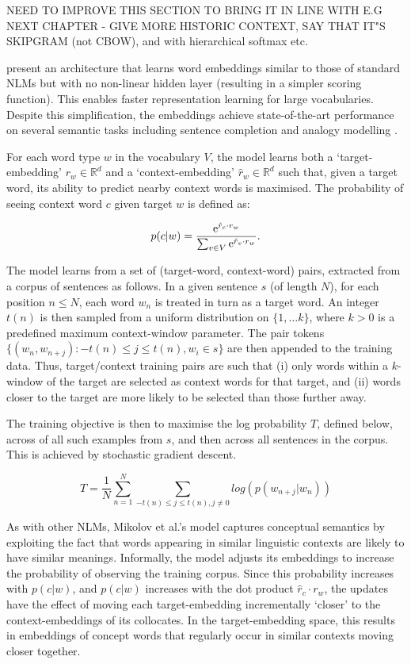 NEED TO IMPROVE THIS SECTION TO BRING IT IN LINE WITH E.G NEXT CHAPTER - GIVE MORE HISTORIC CONTEXT, SAY THAT IT"S SKIPGRAM (not CBOW), and with hierarchical softmax etc.

\cite{mikolov2013efficient} present an architecture that learns word embeddings similar to those of standard NLMs but with no non-linear hidden layer (resulting in a simpler scoring function). This enables faster representation learning for large vocabularies. Despite this simplification, the embeddings achieve state-of-the-art performance on several semantic tasks including sentence completion and analogy modelling \cite{mikolov2013efficient,mikolov2013distributed}.   

For each word type \(w\) in the vocabulary \(V\), the model learns both a `target-embedding' \( r_{w} \in \mathbb{R}^d\) and a `context-embedding' \(\hat{r}_{w} \in \mathbb{R}^d\) such that, given a target word, its ability to predict nearby context words is maximised. The probability of seeing context word \(c\) given target \(w\) is defined as:  

\[p(c|w)  = \frac{\mathrm{e}^{\hat{r}_{c} \cdot r_{w}}}{\sum_{v \in V} \mathrm{e}^{\hat{r}_v\cdot r_{w}}}.\]

The model learns from a set of (target-word, context-word) pairs, extracted from a corpus of sentences as follows. In a given sentence \(s\) (of length \(N\)), for each position \( n \leq N\), each word \(w_n\) is treated in turn as a target word. An integer \( {t(n)} \) is then sampled from a uniform distribution on \( \{1, \dots k \} \), where \(k > 0\) is a predefined maximum context-window parameter. The pair tokens \( \{(w_n, w_{n+j}): -{t(n)}\leq j \leq {t(n)}, w_i \in s \}\) are then appended to the training data. Thus, target/context training pairs are such that (i) only words within a \(k\)-window of the target are selected as context words for that target, and (ii) words closer to the target are more likely to be selected than those further away.

The training objective is then to maximise the log probability \( T\), defined below, across of all such examples from \(s\), and then across all sentences in the corpus. This is achieved by stochastic gradient descent. 

\[ T = \frac{1}{N} \sum_{n=1}^{N} \sum_{-{t(n)}\leq j \leq {t(n)}, j\neq 0} log(  p(w_{n+j}|w_{n}) ) \]

As with other NLMs, Mikolov et al.'s model captures conceptual semantics by exploiting the fact that words appearing in similar linguistic contexts are likely to have similar meanings. Informally, the model adjusts its embeddings to increase the probability of observing the training corpus. Since this probability increases with \(p(c|w)\), and \(p(c|w)\) increases with the dot product \( \hat{r}_c\cdot r_{w} \), the updates have the effect of moving each target-embedding incrementally `closer' to the context-embeddings of its collocates. In the target-embedding space, this results in embeddings of concept words that regularly occur in similar contexts moving closer together.  


